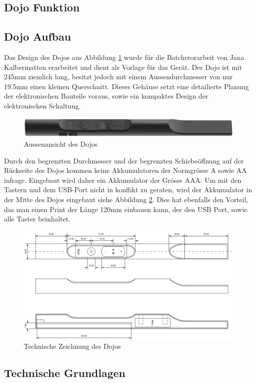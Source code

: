 \subsection{Dojo Funktion}


\subsection{Dojo Aufbau}
Das Design des Dojos aus Abbildung \ref{fig:DojoBild} wurde für die Batcherorarbeit von Jana Kalbermatten erarbeitet und dient als Vorlage für das Gerät. Der Dojo ist mit 245mm ziemlich lang, besitzt jedoch mit einem Aussendurchmesser von nur 19.5mm einen kleinen Querschnitt. Dieses Gehäuse setzt eine detailierte Planung der elektronischen Bauteile voraus, sowie ein kompaktes Design der elektronischen Schaltung.


\begin{figure}[h]
	\centering
	\includegraphics[width=\textwidth]{graphics/DojoBild.png}
	\caption{Aussenansicht des Dojos}
	\label{fig:DojoBild}
\end{figure}

Durch den begrenzten Durchmesser und der begrenzten Schiebeöffnung auf der Rückseite des Dojos kommen keine Akkumulatoren der Normgrösse A sowie AA infrage. Eingebaut wird daher ein Akkumulator der Grösse AAA. Um mit den Tastern und dem USB-Port nicht in konflikt zu geraten, wird der Akkumulator in der Mitte des Dojos eingebaut siehe Abbildung \ref{fig:DojoQuerschnitt}. Dies hat ebenfalls den Vorteil, das man einen Print der Länge 120mm einbauen kann, der den USB Port, sowie alle Taster beinhaltet.

\begin{figure}[h]
	\centering
	\includegraphics[width=\textwidth]{graphics/DojoQuerschnitt.png}
	\caption{Technische Zeichnung des Dojos}
	\label{fig:DojoQuerschnitt}
\end{figure}

\subsection{Technische Grundlagen}
